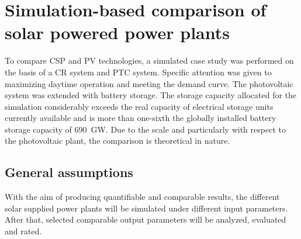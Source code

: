 \chapter{Simulation-based comparison of solar powered power plants}
To compare CSP and PV technologies, a simulated case study was performed on the basis of a CR system and PTC system. 
Specific attention was given to maximizing daytime operation and meeting the demand curve. 
The photovoltaic system was extended with battery storage. 
The storage capacity allocated for the simulation considerably exceeds the real capacity of electrical storage units currently available and is more than one-sixth the globally installed battery storage capacity of \SI{690}{GW}.\cite{IEA2015}
Due to the scale and particularly with respect to the photovoltaic plant, the comparison is theoretical in nature.
\pagebreak
\section{General assumptions}
With the aim of producing quantifiable and comparable results, the different solar supplied power plants will be simulated under different input  parameters. After that, selected comparable output parameters will be analyzed, evaluated and rated.

